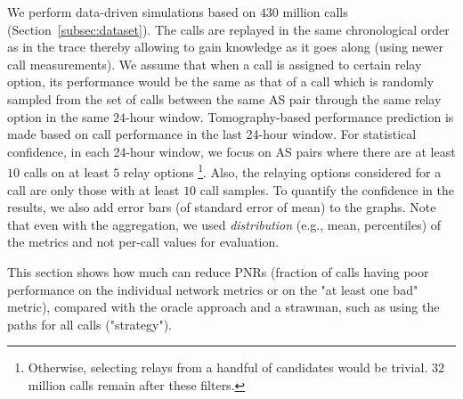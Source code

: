 We perform data-driven simulations based on $430$ million \skype calls (Section~\ref{subsec:dataset}). The calls are replayed in the same chronological order as in the trace thereby allowing \hybrid to gain knowledge as it goes along (using newer call measurements). We assume that when a call is assigned to certain relay option, its performance would be the same as that of a call which is randomly sampled from the set of calls between the same AS pair through the same relay option in the same $24$-hour window. Tomography-based performance prediction is made based on call performance in the last 24-hour window. For statistical confidence, in each 24-hour window, we focus on AS pairs where there are at least $10$ calls on at least $5$ relay options \footnote{Otherwise, selecting relays from a handful of candidates would be trivial. $32$ million calls  remain after these filters.}. Also, the relaying options considered for a call are only those with at least $10$ call samples. %
To quantify the confidence in the results, we also add error bars (of standard error of mean) to the graphs. Note that even with the aggregation, we used {\em distribution} (e.g., mean, percentiles) of the metrics and not per-call values for evaluation.

This section shows how much \hybrid can reduce PNRs (fraction of calls having poor performance on the individual network metrics or on the "at least one bad" metric), compared with the oracle approach and a strawman, such as using the \direct paths for all calls ("\direct strategy").



